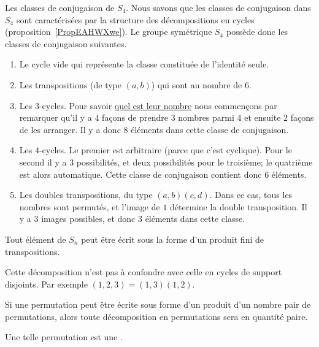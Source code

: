 \begin{example} \label{ExVYZPzub}
    Les classes de conjugaison de \( S_4\). Nous savons que les classes de conjugaison dans \( S_4\) sont caractérisées par la structure des décompositions en cycles (proposition~\ref{PropEAHWXwe}). Le groupe symétrique \( S_4\) possède donc les classes de conjugaison suivantes.
\begin{enumerate}
    \item
        Le cycle vide qui représente la classe constituée de l'identité seule.
    \item
        Les transpositions (de type \( (a,b)\)) qui sont au nombre de \( 6\).
    \item
        Les \( 3\)-cycles. Pour savoir \href{http://www.toujourspret.com/techniques/expression/chants/C/cantique_des_etoiles.php}{quel est leur nombre} nous commençons par remarquer qu'il y a \( 4\) façons de prendre \( 3\) nombres parmi \( 4\) et ensuite \( 2\) façons de les arranger. Il y a donc \( 8\) éléments dans cette classe de conjugaison.
    \item
        Les \( 4\)-cycles. Le premier est arbitraire (parce que c'est cyclique). Pour le second il y a \( 3\) possibilités, et deux possibilités pour le troisième; le quatrième est alors automatique. Cette classe de conjugaison contient donc \( 6\) éléments.
    \item       \label{ITEMooGCMYooKZgFHX}
        Les doubles transpositions, du type \( (a,b)(c,d)\). Dans ce cas, tous les nombres sont permutés, et l'image de $1$ détermine la double transposition. Il y a $3$ images possibles, et donc \( 3\) éléments dans cette classe.
\end{enumerate}
\end{example}

\begin{proposition} \label{PropPWIJbu}
    Tout élément de \( S_n\) peut être écrit sous la forme d'un produit fini de transpositions.
\end{proposition}
Cette décomposition n'est pas à confondre avec celle en cycles de support disjoints. Par exemple \( (1,2,3)=(1,3)(1,2)\).

\begin{propositionDef}\label{PROPooKRHEooAxtmRv}
    Si une permutation peut être écrite sous forme d'un produit d'un nombre pair de permutations, alors toute décomposition en permutations sera en quantité paire.

    Une telle permutation est une .
\end{propositionDef}

